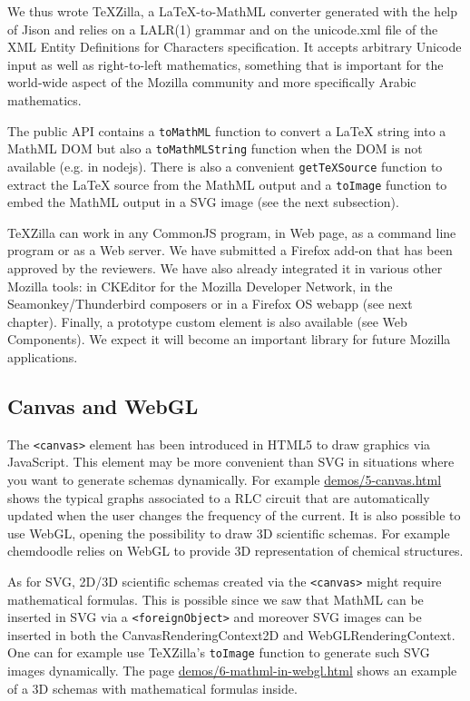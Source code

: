 We thus wrote TeXZilla, a LaTeX-to-MathML converter generated with the help of
Jison and relies on a LALR(1) grammar and on the unicode.xml file of
the XML Entity Definitions for Characters specification. It accepts arbitrary
Unicode input as well as right-to-left mathematics, something that is important
for the world-wide aspect of the Mozilla community and more specifically
Arabic mathematics.

The public API contains a {\tt toMathML} function to convert a LaTeX string
into a MathML DOM but also a {\tt toMathMLString} function when the DOM is
not available (e.g. in nodejs). There is also a convenient {\tt getTeXSource}
function to extract the LaTeX source from the MathML output and a
{\tt toImage} function to embed the MathML output in a SVG image (see the next
subsection).

TeXZilla can work in any CommonJS program, in Web page, as a command line
program or as a Web server. We have submitted a Firefox add-on
that has been approved by the reviewers. We have also already integrated it in
various other Mozilla tools: in CKEditor for the Mozilla Developer Network,
in the Seamonkey/Thunderbird composers or in a Firefox OS webapp (see next
chapter). Finally, a prototype {\tt <x-tex>} custom element is also available
(see Web Components). We expect it will become an important library for future
Mozilla applications.

\subsection{Canvas and WebGL}

The {\tt <canvas>} element has been introduced in HTML5 to draw graphics via
JavaScript. This element may be more convenient than SVG in situations where
you want to generate schemas dynamically. For example \href{http://fred-wang.github.io/MathUI2014/demos/5-canvas.html}{demos/5-canvas.html}
shows the typical graphs associated to a RLC circuit that are automatically
updated when the user changes the frequency of the current. It is also possible
to use WebGL, opening the possibility to draw 3D scientific schemas. For example
chemdoodle relies on WebGL to provide 3D representation of chemical structures.

As for SVG, 2D/3D scientific schemas created via the {\tt <canvas>} might
require mathematical formulas. This is possible since we saw that MathML can be
inserted in SVG via a {\tt <foreignObject>} and moreover SVG images can be
inserted in both the CanvasRenderingContext2D and WebGLRenderingContext. One
can for example use TeXZilla's {\tt toImage} function to generate such SVG
images dynamically. The page \href{http://fred-wang.github.io/MathUI2014/demos/6-mathml-in-webgl.html}{demos/6-mathml-in-webgl.html} shows an
example of a 3D schemas with mathematical formulas inside.

